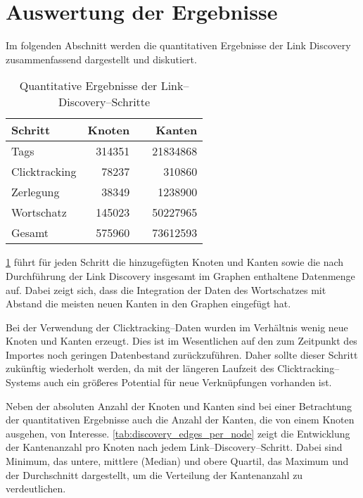 \section{Auswertung der Ergebnisse}
\label{lda_results}

Im folgenden Abschnitt werden die quantitativen Ergebnisse der Link Discovery zusammenfassend dargestellt und diskutiert.

\begin{table}
\centering
\begin{tabular}{lrcr}
    \toprule
    Schritt & Knoten & \phantom{abc} & Kanten \\
    \midrule
    Tags & \num{314351} && \num{21834868} \\
    Clicktracking & \num{78237} && \num{310860} \\
    Zerlegung & \num{38349} && \num{1238900} \\
    Wortschatz & \num{145023} && \num{50227965} \\
    \midrule
    Gesamt & \num{575960} && \num{73612593} \\
    \bottomrule
\end{tabular}
\caption{Quantitative Ergebnisse der Link--Discovery--Schritte}
\label{tab:discovery_amounts}
\end{table}

\cref{tab:discovery_amounts} führt für jeden Schritt die hinzugefügten Knoten und Kanten sowie die nach Durchführung der Link Discovery insgesamt im Graphen enthaltene Datenmenge auf. Dabei zeigt sich, dass die Integration der Daten des Wortschatzes mit Abstand die meisten neuen Kanten in den Graphen eingefügt hat. 

Bei der Verwendung der Clicktracking--Daten wurden im Verhältnis wenig neue Knoten und Kanten erzeugt. Dies ist im Wesentlichen auf den zum Zeitpunkt des Importes noch geringen Datenbestand zurückzuführen. Daher sollte dieser Schritt zukünftig wiederholt werden, da mit der längeren Laufzeit des Clicktracking--Systems auch ein größeres Potential für neue Verknüpfungen vorhanden ist.

Neben der absoluten Anzahl der Knoten und Kanten sind bei einer Betrachtung der quantitativen Ergebnisse auch die Anzahl der Kanten, die von einem Knoten ausgehen, von Interesse. \cref{tab:discovery_edges_per_node} zeigt die Entwicklung der Kantenanzahl pro Knoten nach jedem Link--Discovery--Schritt. Dabei sind Minimum, das untere, mittlere (Median) und obere Quartil, das Maximum und der Durchschnitt dargestellt, um die Verteilung der Kantenanzahl zu verdeutlichen.

